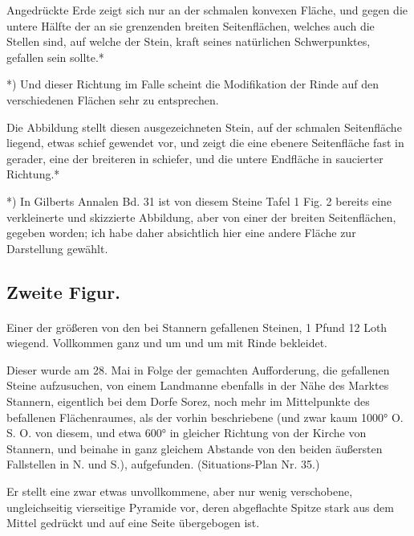 \documentclass[a4paper, 11pt, oneside, german]{article}
\begin{document}
Angedrückte Erde zeigt sich nur an der schmalen konvexen Fläche, und gegen die untere Hälfte der an sie grenzenden breiten Seitenflächen, welches auch die Stellen sind, auf welche der Stein, kraft seines natürlichen Schwerpunktes, gefallen sein sollte.*

*) Und dieser Richtung im Falle scheint die Modifikation der Rinde auf den verschiedenen Flächen sehr zu entsprechen.

Die Abbildung stellt diesen ausgezeichneten Stein, auf der schmalen Seitenfläche liegend, etwas schief gewendet vor, und zeigt die eine ebenere Seitenfläche fast in gerader, eine der breiteren in schiefer, und die untere Endfläche in saucierter Richtung.*

*) In Gilberts Annalen Bd. 31 ist von diesem Steine Tafel 1 Fig. 2 bereits eine verkleinerte und skizzierte Abbildung, aber von einer der breiten Seitenflächen, gegeben worden; ich habe daher absichtlich hier eine andere Fläche zur Darstellung gewählt.

\subsection{Zweite Figur.}
\paragraph{}
Einer der größeren von den bei Stannern gefallenen Steinen, 1 Pfund 12 Loth wiegend. Vollkommen ganz und um und um mit Rinde bekleidet.

Dieser wurde am 28. Mai in Folge der gemachten Aufforderung, die gefallenen Steine aufzusuchen, von einem Landmanne ebenfalls in der Nähe des Marktes Stannern, eigentlich bei dem Dorfe Sorez, noch mehr im Mittelpunkte des befallenen Flächenraumes, als der vorhin beschriebene (und zwar kaum 1000° O. S. O. von diesem, und etwa 600° in gleicher Richtung von der Kirche von Stannern, und beinahe in ganz gleichem Abstande von den beiden äußersten Fallstellen in N. und S.), aufgefunden. (Situations-Plan Nr. 35.)

Er stellt eine zwar etwas unvollkommene, aber nur wenig verschobene, ungleichseitig vierseitige Pyramide vor, deren abgeflachte Spitze stark aus dem Mittel gedrückt und auf eine Seite übergebogen ist.
\end{document}

